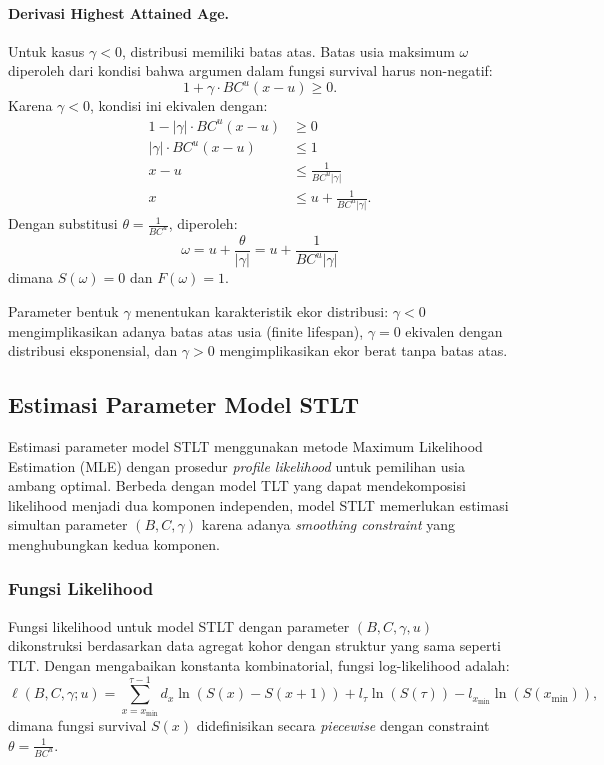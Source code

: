 \paragraph{Derivasi Highest Attained Age.} Untuk kasus $\gamma < 0$, distribusi memiliki batas atas. Batas usia maksimum $\omega$ diperoleh dari kondisi bahwa argumen dalam fungsi survival harus non-negatif:
\begin{equation}
1 + \gamma \cdot BC^u(x-u) \geq 0.
\end{equation}
Karena $\gamma < 0$, kondisi ini ekivalen dengan:
\begin{align}
1 - |\gamma| \cdot BC^u(x-u) &\geq 0 \nonumber \\
|\gamma| \cdot BC^u(x-u) &\leq 1 \nonumber \\
x - u &\leq \frac{1}{BC^u|\gamma|} \nonumber \\
x &\leq u + \frac{1}{BC^u|\gamma|}.
\end{align}
Dengan substitusi $\theta = \frac{1}{BC^u}$, diperoleh:
\begin{equation}
\boxed{\omega = u + \frac{\theta}{|\gamma|} = u + \frac{1}{BC^u|\gamma|}}
\label{eq:stlt_omega_derivation}
\end{equation}
dimana $S(\omega) = 0$ dan $F(\omega) = 1$.

Parameter bentuk $\gamma$ menentukan karakteristik ekor distribusi: $\gamma < 0$ mengimplikasikan adanya batas atas usia (finite lifespan), $\gamma = 0$ ekivalen dengan distribusi eksponensial, dan $\gamma > 0$ mengimplikasikan ekor berat tanpa batas atas.

\subsection{Estimasi Parameter Model STLT}

Estimasi parameter model STLT menggunakan metode Maximum Likelihood Estimation (MLE) dengan prosedur \textit{profile likelihood} untuk pemilihan usia ambang optimal. Berbeda dengan model TLT yang dapat mendekomposisi likelihood menjadi dua komponen independen, model STLT memerlukan estimasi simultan parameter $(B, C, \gamma)$ karena adanya \textit{smoothing constraint} yang menghubungkan kedua komponen.

\subsubsection{Fungsi Likelihood}

Fungsi likelihood untuk model STLT dengan parameter $(B, C, \gamma, u)$ dikonstruksi berdasarkan data agregat kohor dengan struktur yang sama seperti TLT. Dengan mengabaikan konstanta kombinatorial, fungsi log-likelihood adalah:
\begin{equation}
\ell(B, C, \gamma; u) = \sum_{x=x_{\text{min}}}^{\tau-1} d_x \ln(S(x) - S(x+1)) + l_\tau \ln(S(\tau)) - l_{x_{\text{min}}} \ln(S(x_{\text{min}})),
\label{eq:stlt_loglikelihood}
\end{equation}
dimana fungsi survival $S(x)$ didefinisikan secara \textit{piecewise} dengan constraint $\theta = \frac{1}{BC^u}$.

